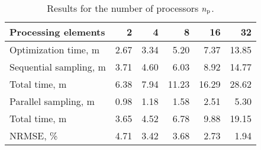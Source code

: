 \begin{table}[h]
  \centering
  \caption{Results for the number of processors ${n_\text{p}}$.}
  \begin{tabular*}{1\linewidth}{l@{\hskip 4em}rrrrr}
    \toprule
    Processing elements    & 2 & 4 & 8 & 16 & 32 \\
    \midrule
    \midrule
    Optimization time, m   & 2.67 & 3.34 &  5.20 &  7.37 & 13.85 \\
    \midrule
    Sequential sampling, m & 3.71 & 4.60 &  6.03 &  8.92 & 14.77 \\
    Total time, m          & 6.38 & 7.94 & 11.23 & 16.29 & 28.62 \\
    \midrule
    Parallel sampling, m   & 0.98 & 1.18 &  1.58 &  2.51 & 5.30 \\
    Total time, m          & 3.65 & 4.52 &  6.78 &  9.88 & 19.15 \\
    \midrule
    NRMSE, \%              & 4.71 & 3.42 &  3.68 &  2.73 &  1.94 \\
    \bottomrule
  \end{tabular*}
  \vspace{-1em}
\end{table}
